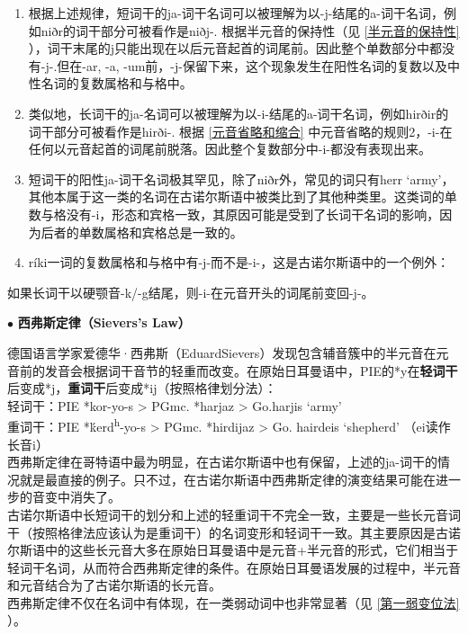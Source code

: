 \begin{enumerate}

  \item
        根据上述规律，短词干的ja-词干名词可以被理解为以-j-结尾的a-词干名词，例如niðr的词干部分可被看作是niðj-.
        根据半元音的保持性（见 \ref{半元音的保持性} ），词干末尾的j只能出现在以后元音起首的词尾前。因此整个单数部分中都没有-j-.但在-ar, -a, -um前，-j-保留下来，这个现象发生在阳性名词的复数以及中性名词的复数属格和与格中。
  \item
        类似地，长词干的ja-名词可以被理解为以-i-结尾的a-词干名词，例如hirðir的词干部分可被看作是hirði-.
        根据 \ref{元音省略和缩合} 中元音省略的规则2，-i-在任何以元音起首的词尾前脱落。因此整个复数部分中-i-都没有表现出来。
  \item
        短词干的阳性ja-词干名词极其罕见，除了niðr外，常见的词只有herr
        `army'，其他本属于这一类的名词在古诺尔斯语中被类比到了其他种类里。这类词的单数与格没有-i，形态和宾格一致，其原因可能是受到了长词干名词的影响，因为后者的单数属格和宾格总是一致的。
  \item
        ríki一词的复数属格和与格中有-j-而不是-i-，这是古诺尔斯语中的一个例外：
\end{enumerate}
\begin{info}
  如果长词干以硬颚音-k/-g结尾，则-i-在元音开头的词尾前变回-j-。
\end{info}

\begin{info}
  $\bullet$ \textbf{西弗斯定律（Sievers's Law）}

  \indent
  德国语言学家爱德华·西弗斯（EduardSievers）发现包含辅音簇中的半元音在元音前的发音会根据词干音节的轻重而改变。在原始日耳曼语中，PIE的*y在\textbf{轻词干}后变成*j，\textbf{重词干}后变成*ij（按照格律划分法）：\\
  \indent
  轻词干：PIE *kor-yo-s > PGmc. *harjaz > Go.harjis `army'\\
  \indent
  重词干：PIE *ḱerd\textsuperscript{h}-yo-s > PGmc. *hirdijaz > Go. hairdeis `shepherd' （ei读作长音i）\\
  \indent
  西弗斯定律在哥特语中最为明显，在古诺尔斯语中也有保留，上述的ja-词干的情况就是最直接的例子。只不过，在古诺尔斯语中西弗斯定律的演变结果可能在进一步的音变中消失了。\\
  \indent
  古诺尔斯语中长短词干的划分和上述的轻重词干不完全一致，主要是一些长元音词干（按照格律法应该认为是重词干）的名词变形和轻词干一致。其主要原因是古诺尔斯语中的这些长元音大多在原始日耳曼语中是元音+半元音的形式，它们相当于轻词干名词，从而符合西弗斯定律的条件。在原始日耳曼语发展的过程中，半元音和元音结合为了古诺尔斯语的长元音。\\
  \indent
  西弗斯定律不仅在名词中有体现，在一类弱动词中也非常显著（见 \ref{第一弱变位法} ）。
\end{info}

